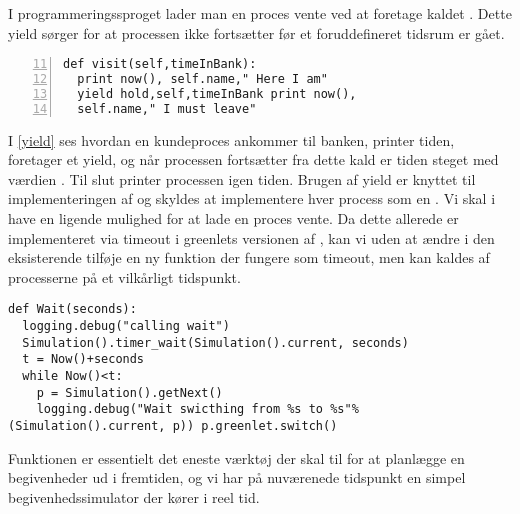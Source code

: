 I programmeringssproget \simpy lader man en proces vente ved at
foretage kaldet . Dette yield sørger for at processen ikke
fortsætter før et foruddefineret tidsrum er gået.

\begin{lstlisting}[firstnumber=11 , stepnumber=2, numbers=left,float=hbtp, label=yield, caption= Et yield i \simpy (Taget fra Bank05.py i eksemplet fra \simpy)] 
def visit(self,timeInBank): 
  print now(), self.name," Here I am" 
  yield hold,self,timeInBank print now(),
  self.name," I must leave" 
\end{lstlisting}

I \cref{yield} ses hvordan en kundeproces ankommer til banken,
printer tiden, foretager et yield, og når processen fortsætter
fra dette kald er tiden steget med værdien .
Til slut printer processen igen tiden. Brugen af yield er knyttet
til implementeringen af \simpy og skyldes at \simpy implementere
hver process som en . Vi skal i \pycsp have en
ligende mulighed for at lade en proces vente. Da dette allerede er
implementeret via timeout i greenlets versionen af \pycsp, kan vi
uden at ændre i den eksisterende \sched tilføje en ny funktion
 der fungere som timeout, men kan kaldes af processerne
på et vilkårligt tidspunkt. 

\begin{lstlisting}[firstnumber=20,float=hbtp, label=wait, caption=Wait i simuleringsversionen.] 
def Wait(seconds): 
  logging.debug("calling wait")
  Simulation().timer_wait(Simulation().current, seconds) 
  t = Now()+seconds
  while Now()<t: 
    p = Simulation().getNext() 
    logging.debug("Wait swicthing from %s to %s"%(Simulation().current, p)) p.greenlet.switch()
\end{lstlisting}

Funktionen  er essentielt det eneste værktøj der skal til for at planlægge en begivenheder ud i fremtiden, og vi har på nuværenede tidspunkt en  simpel begivenhedssimulator der kører i reel tid.


